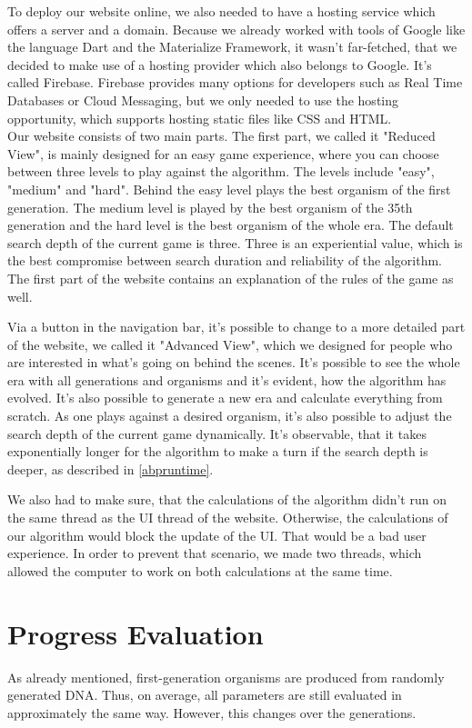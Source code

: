To deploy our website online, we also needed to have a hosting service which offers a server and a domain. Because we already worked with tools of Google like the language Dart and the Materialize Framework, it wasn't far-fetched, that we decided to make use of a hosting provider which also belongs to Google. It's called Firebase. Firebase provides many options for developers such as Real Time Databases or Cloud Messaging, but we only needed to use the hosting opportunity, which supports hosting static files like CSS and HTML.\\

Our website consists of two main parts. The first part, we called it "Reduced View", is mainly designed for an easy game experience, where you can choose between three levels to play against the algorithm. The levels include "easy", "medium" and "hard". Behind the easy level plays the best organism of the first generation. 
The medium level is played by the best organism of the 35th %
generation and the hard level is the best organism of the whole era. The default search depth of the current game is three. Three is an experiential value, which is the best compromise between search duration and reliability of the algorithm.
The first part of the website contains an explanation of the rules of the game as well.

Via a button in the navigation bar, it's possible to change to a more detailed  part of the website, we called it "Advanced View", which we designed for people who are interested in what's going on behind the scenes. It's possible to see the whole era with all generations and organisms and it's evident, how the algorithm has evolved. It's also possible to generate a new era and calculate everything from scratch. As one plays against a desired organism, it's also possible to adjust the search depth of the current game dynamically. It's observable, that it takes exponentially longer for the algorithm to make a turn if the search depth is deeper, as described in \autoref{abpruntime}. %

We also had to make sure, that the calculations of the algorithm didn't run on the same thread as the UI thread of the website. Otherwise, the calculations of our algorithm would block the update of the UI. That would be a bad user experience. In order to prevent that scenario, we made two threads, which allowed the computer to work on both calculations at the same time. 


\section{Progress Evaluation}
As already mentioned, first-generation organisms are produced from randomly generated DNA. Thus, on average, all parameters are still evaluated in approximately the same way. However, this changes over the generations.

